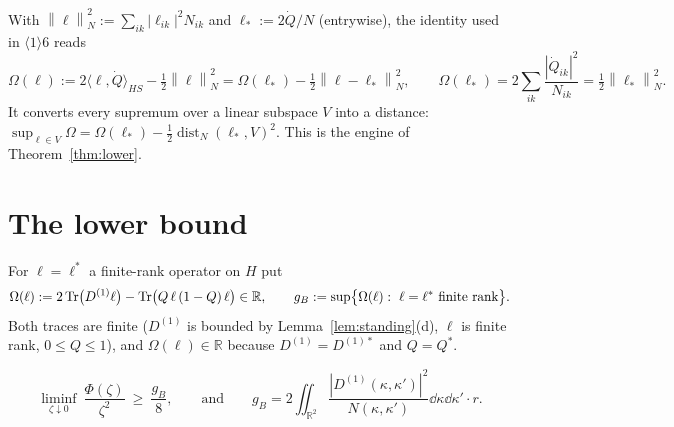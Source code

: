 \documentclass[11pt]{article}
\newcommand{\norm}[1]{\left\lVert #1\right\rVert}
\theoremstyle{definition}\newtheorem{problem}[theorem]{Problem}
\begin{document}
\begin{remark}\label{rem:square}
With \(\norm\ell_N^2:=\sum_{ik}|\ell_{ik}|^2N_{ik}\) and \(\ell_*:=2\dot Q/N\) (entrywise), the
identity used in \(\langle1\rangle6\) reads
\begin{equation}\label{eq:square}
 \Omega(\ell):=2\langle\ell,\dot Q\rangle_{HS}-\tfrac12\norm{\ell}_N^2
 =\Omega(\ell_*)-\tfrac12\norm{\ell-\ell_*}_N^2,\qquad
 \Omega(\ell_*)=2\sum_{ik}\frac{|\dot Q_{ik}|^2}{N_{ik}}=\tfrac12\norm{\ell_*}_N^2 .
\end{equation}
It converts every supremum over a linear subspace \(V\) into a distance:
\(\sup_{\ell\in V}\Omega=\Omega(\ell_*)-\frac12\operatorname{dist}_N(\ell_*,V)^2\).  This is the engine
of Theorem~\ref{thm:lower}.
\end{remark}

\section{The lower bound}\label{sec:lower}

\begin{definition}\label{def:gB}
For \(\ell=\ell^*\) a finite-rank operator on \(H\) put
\begin{equation}\label{eq:Omega}
 \Omega(\ell):=2\operatorname{Tr}\bigl(D^{(1)}\ell\bigr)-\operatorname{Tr}\bigl(Q\,\ell\,(1-Q)\,\ell\bigr)\in\mathbb R,
 \qquad
 g_B:=\sup\bigl\{\Omega(\ell):\ \ell=\ell^*\ \text{finite rank}\bigr\}.
\end{equation}
Both traces are finite (\(D^{(1)}\) is bounded by Lemma~\ref{lem:standing}(d), \(\ell\) is finite
rank, \(0\le Q\le1\)), and \(\Omega(\ell)\in\mathbb R\) because \(D^{(1)}=D^{(1)*}\) and
\(Q=Q^*\).
\end{definition}

\begin{theorem}\label{thm:lower}
\[
 \liminf_{\zeta\downarrow0}\ \frac{\Phi(\zeta)}{\zeta^{2}}\ \ge\ \frac{g_B}{8},
 \qquad\text{and}\qquad
 g_B=2\iint_{\mathbb R^2}\frac{|D^{(1)}(\kappa,\kappa')|^2}{N(\kappa,\kappa')}\dd\kappa\dd\kappa'
 \cdot r .
\]
\end{theorem}

\end{document}
